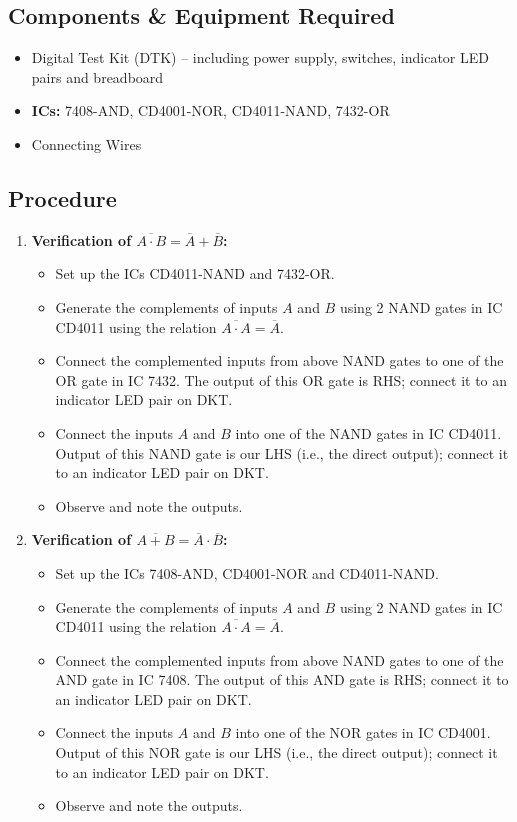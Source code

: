 \documentclass[11pt, a4paper]{article}
\begin{document}
\subsection{Components \& Equipment Required}
\begin{itemize}
    \item Digital Test Kit (DTK) -- including power supply, switches, indicator LED pairs and breadboard
    \item \textbf{ICs:} 7408-AND, CD4001-NOR, CD4011-NAND, 7432-OR
    \item Connecting Wires
\end{itemize}

\subsection{Procedure}
\begin{enumerate}[label=\textbf{(\alph*)}]
    \item \textbf{Verification of $\overline{A \cdot B} = \overline{A} + \overline{B}$:}
    \begin{itemize}
        \item Set up the ICs CD4011-NAND and 7432-OR.
        \item Generate the complements of inputs $A$ and $B$ using 2 NAND gates in IC CD4011 using the relation $\overline{A \cdot A}=\overline{A}$.
        \item Connect the complemented inputs from above NAND gates to one of the OR gate in IC 7432. The output of this OR gate is RHS; connect it to an indicator LED pair on DKT.
        \item Connect the inputs $A$ and $B$ into one of the NAND gates in IC CD4011. Output of this NAND gate is our LHS (i.e., the direct output); connect it to an indicator LED pair on DKT.
        \item Observe and note the outputs.
    \end{itemize}
    \item \textbf{Verification of $\overline{A + B} = \overline{A} \cdot \overline{B}$:}
    \begin{itemize}
        \item Set up the ICs 7408-AND, CD4001-NOR and CD4011-NAND.
        \item Generate the complements of inputs $A$ and $B$ using 2 NAND gates in IC CD4011 using the relation $\overline{A \cdot A}=\overline{A}$.
        \item Connect the complemented inputs from above NAND gates to one of the AND gate in IC 7408. The output of this AND gate is RHS; connect it to an indicator LED pair on DKT.
        \item Connect the inputs $A$ and $B$ into one of the NOR gates in IC CD4001. Output of this NOR gate is our LHS (i.e., the direct output); connect it to an indicator LED pair on DKT.
        \item Observe and note the outputs.
    \end{itemize}
\end{enumerate}
\end{document}
